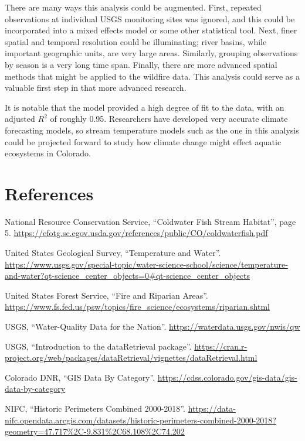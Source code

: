 \documentclass[
]{article}
\begin{document}
There are many ways this analysis could be augmented. First, repeated
observations at individual USGS monitoring sites was ignored, and this
could be incorporated into a mixed effects model or some other
statistical tool. Next, finer spatial and temporal resolution could be
illuminating; river basins, while important geographic units, are very
large areas. Similarly, grouping observations by season is a very long
time span. Finally, there are more advanced spatial methods that might
be applied to the wildfire data. This analysis could serve as a valuable
first step in that more advanced research.

It is notable that the model provided a high degree of fit to the data,
with an adjusted \(R^2\) of roughly 0.95. Researchers have developed
very accurate climate forecasting models, so stream temperature models
such as the one in this analysis could be projected forward to study how
climate change might effect aquatic ecosystems in Colorado.

\hypertarget{references}{%
\section{References}\label{references}}

National Resource Conservation Service, ``Coldwater Fish Stream
Habitat'', page 5.
\url{https://efotg.sc.egov.usda.gov/references/public/CO/coldwaterfish.pdf}

United States Geological Survey, ``Temperature and Water''.
\url{https://www.usgs.gov/special-topic/water-science-school/science/temperature-and-water?qt-science_center_objects=0\#qt-science_center_objects}

United States Forest Service, ``Fire and Riparian Areas''.
\url{https://www.fs.fed.us/psw/topics/fire_science/ecosystems/riparian.shtml}

USGS, ``Water-Quality Data for the Nation''.
\url{https://waterdata.usgs.gov/nwis/qw}

USGS, ``Introduction to the dataRetrieval package''.
\url{https://cran.r-project.org/web/packages/dataRetrieval/vignettes/dataRetrieval.html}

Colorado DNR, ``GIS Data By Category''.
\url{https://cdss.colorado.gov/gis-data/gis-data-by-category}

NIFC, ``Historic Perimeters Combined 2000-2018''.
\url{https://data-nifc.opendata.arcgis.com/datasets/historic-perimeters-combined-2000-2018?geometry=47.717\%2C-9.831\%2C68.108\%2C74.202}
\end{document}
